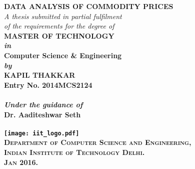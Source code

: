\begin{titlepage}
\begin{center}

\LARGE{\textsf{\bfseries DATA ANALYSIS OF COMMODITY PRICES}}\\
\vspace{20pt}
\normalsize
\emph{A thesis submitted in partial fulfilment} \\
\emph{of the requirements for the degree of} \\
\vspace{20pt}
\bfseries MASTER OF TECHNOLOGY \\
\vspace{20pt}
\emph {in}\\
\vspace{20pt}
\bfseries Computer Science \& Engineering \\
\vspace{20pt}
\emph {by}\\
\vspace{20pt}
\Large{\textsf{\bfseries KAPIL THAKKAR}} \\
{\normalsize \textsf{\bfseries Entry No. 2014MCS2124}}\\
\ \\
{\normalsize \emph {Under the guidance of}}
\ \\
\Large{\textsf{\bfseries Dr. Aaditeshwar Seth}} \\
\ \\
\vspace{30pt}
\texttt{[image: iit\_logo.pdf]} \\
\vspace{10pt}
\large{\textsc{Department of Computer Science and Engineering,\\
Indian Institute of Technology Delhi.\\ Jan 2016.}}
\end{center}
\end{titlepage}
